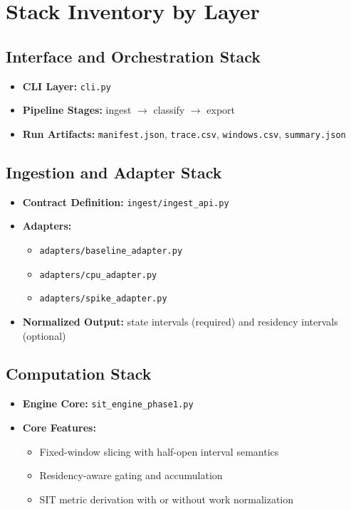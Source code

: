 \documentclass[11pt,a4paper]{article}
\begin{document}
\section{Stack Inventory by Layer}
\subsection{Interface and Orchestration Stack}
\begin{itemize}[leftmargin=1.4em]
  \item \textbf{CLI Layer:} \texttt{cli.py}
  \item \textbf{Pipeline Stages:} ingest $\rightarrow$ classify $\rightarrow$ export
  \item \textbf{Run Artifacts:} \texttt{manifest.json}, \texttt{trace.csv}, \texttt{windows.csv}, \texttt{summary.json}
\end{itemize}

\subsection{Ingestion and Adapter Stack}
\begin{itemize}[leftmargin=1.4em]
  \item \textbf{Contract Definition:} \texttt{ingest/ingest\_api.py}
  \item \textbf{Adapters:}
  \begin{itemize}
    \item \texttt{adapters/baseline\_adapter.py}
    \item \texttt{adapters/cpu\_adapter.py}
    \item \texttt{adapters/spike\_adapter.py}
  \end{itemize}
  \item \textbf{Normalized Output:} state intervals (required) and residency intervals (optional)
\end{itemize}

\subsection{Computation Stack}
\begin{itemize}[leftmargin=1.4em]
  \item \textbf{Engine Core:} \texttt{sit\_engine\_phase1.py}
  \item \textbf{Core Features:}
  \begin{itemize}
    \item Fixed-window slicing with half-open interval semantics
    \item Residency-aware gating and accumulation
    \item SIT metric derivation with or without work normalization
  \end{itemize}
\end{itemize}
\end{document}
